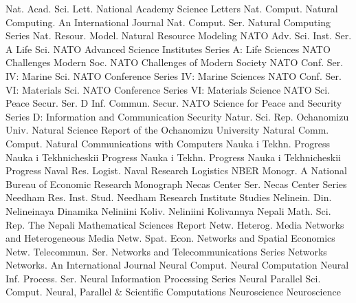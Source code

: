 {Nat. Acad. Sci. Lett.}
{National Academy Science Letters}
{Nat. Comput.}
{Natural Computing. An International Journal}
{Nat. Comput. Ser.}
{Natural Computing Series}
{Nat. Resour. Model.}
{Natural Resource Modeling}
{NATO Adv. Sci. Inst. Ser. A Life Sci.}
{NATO Advanced Science Institutes Series A: Life Sciences}
{NATO Challenges Modern Soc.}
{NATO Challenges of Modern Society}
{NATO Conf. Ser. IV: Marine Sci.}
{NATO Conference Series IV: Marine Sciences}
{NATO Conf. Ser. VI: Materials Sci.}
{NATO Conference Series VI: Materials Science}
{NATO Sci. Peace Secur. Ser. D Inf. Commun. Secur.}
{NATO Science for Peace and Security Series D: Information and Communication Security}
{Natur. Sci. Rep. Ochanomizu Univ.}
{Natural Science Report of the Ochanomizu University}
{Natural Comm. Comput.}
{Natural Communications with Computers}
{Nauka i Tekhn. Progress}
{Nauka i Tekhnicheskii Progress}
{Nauka i Tekhn. Progress}
{Nauka i Tekhnicheskii Progress}
{Naval Res. Logist.}
{Naval Research Logistics}
{NBER Monogr.}
{A National Bureau of Economic Research Monograph}
{Necas Center Ser.}
{Necas Center Series}
{Needham Res. Inst. Stud.}
{Needham Research Institute Studies}
{Nelinein. Din.}
{Nelineinaya Dinamika}
{Neliniini Koliv.}
{Neliniini Kolivannya}
{Nepali Math. Sci. Rep.}
{The Nepali Mathematical Sciences Report}
{Netw. Heterog. Media}
{Networks and Heterogeneous Media}
{Netw. Spat. Econ.}
{Networks and Spatial Economics}
{Netw. Telecommun. Ser.}
{Networks and Telecommunications Series}
{Networks}
{Networks. An International Journal}
{Neural Comput.}
{Neural Computation}
{Neural Inf. Process. Ser.}
{Neural Information Processing Series}
{Neural Parallel Sci. Comput.}
{Neural, Parallel & Scientific Computations}
{Neuroscience}
{Neuroscience}
